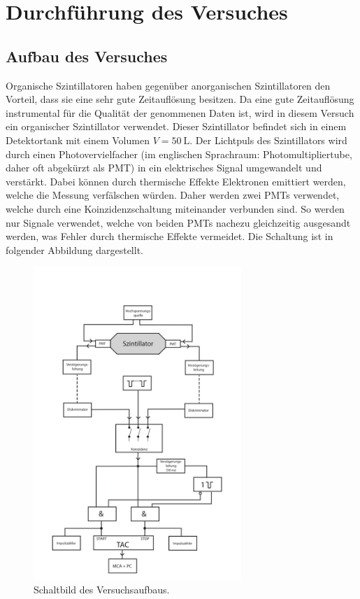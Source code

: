 \section{Durchführung des Versuches}
\label{sec:Durchführung}
\subsection{Aufbau des Versuches}
\label{subsec:Aufbau}
Organische Szintillatoren haben gegenüber anorganischen Szintillatoren den Vorteil, dass sie eine sehr
gute Zeitauflösung besitzen. Da eine gute Zeitauflösung instrumental für die Qualität der genommenen
Daten ist, wird in diesem Versuch ein organischer Szintillator verwendet.
Dieser Szintillator befindet sich in einem Detektortank mit einem Volumen $V = \SI{50}{\liter}$.
Der Lichtpuls des Szintillators wird durch einen Photovervielfacher (im englischen Sprachraum: Photomultipliertube,
daher oft abgekürzt als PMT) in ein elektrisches Signal umgewandelt und verstärkt.
Dabei können durch thermische Effekte Elektronen emittiert werden, welche die
Messung verfälschen würden. Daher werden zwei PMTs verwendet, welche durch eine
Koinzidenzschaltung miteinander verbunden sind. So werden nur Signale verwendet, welche
von beiden PMTs nachezu gleichzeitig ausgesandt werden, was Fehler durch thermische
Effekte vermeidet.
Die Schaltung ist in folgender Abbildung dargestellt.
\begin{figure}[H]
  \centering
    \includegraphics[width=0.7\textwidth]{pictures/Schaltbild.png}
    \caption{Schaltbild des Versuchsaufbaus. \cite{versuchsbeschreibung}}
    \label{fig:Schaltbild}
\end{figure}
